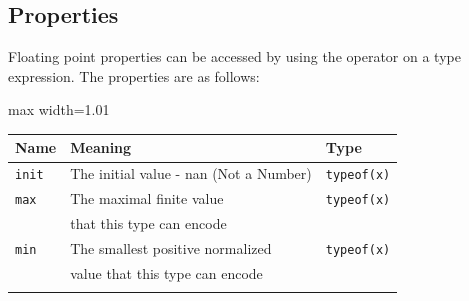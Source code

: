 \subsection{Properties}
\label{sec:org52a5d6e}

Floating point properties can be accessed by using the \token{::} operator on a
type expression. The properties are as follows:

\begin{center}
  \begin{adjustbox}{max width=1.01\linewidth}
    \begin{threeparttable}
      \begin{tabular}{|l|ll|}
        \hline
        Name & Meaning & Type\\[0pt]
        \hline
        \hline
        \texttt{init} & The initial value - nan (Not a Number) & \texttt{typeof(x)}\\[0pt]
        \Xhline{0.001pt}
        \texttt{max} & The maximal finite value & \texttt{typeof(x)}\\
        & that this type can encode & \\[0pt]
        \Xhline{0.001pt}

        \texttt{min} & The smallest positive normalized & \texttt{typeof(x)}\\
        & value that this type can encode & \\[0pt]
        \Xhline{0.001pt}


\end{tabular}
\end{threeparttable}
\end{adjustbox}
\end{center}

